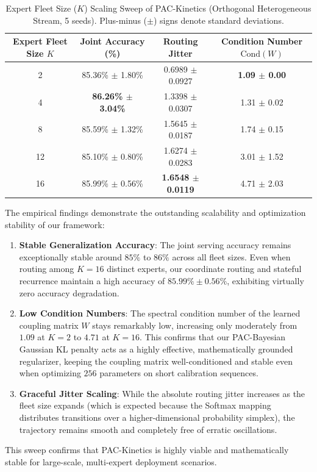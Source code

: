 \begin{table}[tb]
\centering
\caption{Expert Fleet Size ($K$) Scaling Sweep of PAC-Kinetics (Orthogonal Heterogeneous Stream, 5 seeds). Plus-minus ($\pm$) signs denote standard deviations.}
\label{tab:expert_scaling_sweep}
\vskip 0.1in
\begin{tabular}{cccc}
\toprule
Expert Fleet Size $K$ & Joint Accuracy (\%) & Routing Jitter & Condition Number $\text{Cond}(W)$ \\
\midrule
2 & 85.36\% $\pm$ 1.80\% & 0.6989 $\pm$ 0.0927 & \textbf{1.09 $\pm$ 0.00} \\
4 & \textbf{86.26\% $\pm$ 3.04\%} & 1.3398 $\pm$ 0.0307 & 1.31 $\pm$ 0.02 \\
8 & 85.59\% $\pm$ 1.32\% & 1.5645 $\pm$ 0.0187 & 1.74 $\pm$ 0.15 \\
12 & 85.10\% $\pm$ 0.80\% & 1.6274 $\pm$ 0.0283 & 3.01 $\pm$ 1.52 \\
16 & 85.99\% $\pm$ 0.56\% & \textbf{1.6548 $\pm$ 0.0119} & 4.71 $\pm$ 2.03 \\
\bottomrule
\end{tabular}
\end{table}

The empirical findings demonstrate the outstanding scalability and optimization stability of our framework:
\begin{enumerate}
    \item \textbf{Stable Generalization Accuracy}: The joint serving accuracy remains exceptionally stable around $85\%$ to $86\%$ across all fleet sizes. Even when routing among $K=16$ distinct experts, our coordinate routing and stateful recurrence maintain a high accuracy of $85.99\% \pm 0.56\%$, exhibiting virtually zero accuracy degradation.
    \item \textbf{Low Condition Numbers}: The spectral condition number of the learned coupling matrix $W$ stays remarkably low, increasing only moderately from $1.09$ at $K=2$ to $4.71$ at $K=16$. This confirms that our PAC-Bayesian Gaussian KL penalty acts as a highly effective, mathematically grounded regularizer, keeping the coupling matrix well-conditioned and stable even when optimizing $256$ parameters on short calibration sequences.
    \item \textbf{Graceful Jitter Scaling}: While the absolute routing jitter increases as the fleet size expands (which is expected because the Softmax mapping distributes transitions over a higher-dimensional probability simplex), the trajectory remains smooth and completely free of erratic oscillations.
\end{enumerate}
This sweep confirms that PAC-Kinetics is highly viable and mathematically stable for large-scale, multi-expert deployment scenarios.

